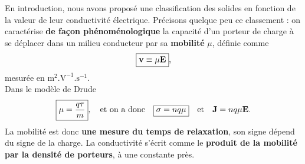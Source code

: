 \documentclass[11pt,a4paper]{report}
\begin{document}

En introduction, nous avons proposé une classification des solides en fonction de la valeur de leur conductivité électrique. Précisons quelque peu ce classement : on caractérise \textbf{de façon phénoménologique} la capacité d'un porteur de charge à se déplacer dans un milieu conducteur par sa \textbf{mobilité} $\mu$, définie comme
\begin{equation}
	\boxed{\bold{v} \equiv \mu \bold{E}},
\end{equation}
mesurée en $\text{m}^2.\text{V}^{-1}.\text{s}^{-1}$.\\

Dans le modèle de Drude 
\begin{equation}
	\boxed{\mu = \frac{q\tau}{m}}, \quad\text{et on a donc}\quad \boxed{\sigma = nq\mu} \quad\text{et}\quad \bold{J} = nq\mu \bold{E}.
\end{equation} 
La mobilité est donc \textbf{une mesure du temps de relaxation}, son signe dépend du signe de la charge. La conductivité s'écrit comme le \textbf{produit de la mobilité par la densité de porteurs}, à une constante près.\\
\end{document}

